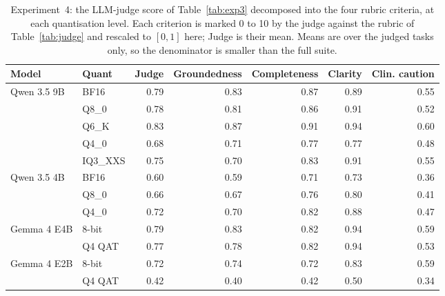 \begin{table}[H]
\centering
\caption{Experiment~4: the LLM-judge score of Table~\ref{tab:exp3} decomposed into the four rubric criteria, at each quantisation level. Each criterion is marked 0 to 10 by the judge against the rubric of Table~\ref{tab:judge} and rescaled to $[0,1]$ here; Judge is their mean. Means are over the judged tasks only, so the denominator is smaller than the full suite.}
\label{tab:exp3_judge}
\small
\setlength{\tabcolsep}{5pt}
\begin{tabular}{@{}ll rrrrr@{}}
\toprule
Model & Quant & Judge & Groundedness & Completeness & Clarity & Clin. caution \\
\midrule
Qwen 3.5 9B & BF16 & 0.79 & 0.83 & 0.87 & 0.89 & 0.55 \\
 & Q8\_0 & 0.78 & 0.81 & 0.86 & 0.91 & 0.52 \\
 & Q6\_K & 0.83 & 0.87 & 0.91 & 0.94 & 0.60 \\
 & Q4\_0 & 0.68 & 0.71 & 0.77 & 0.77 & 0.48 \\
 & IQ3\_XXS & 0.75 & 0.70 & 0.83 & 0.91 & 0.55 \\
\midrule
Qwen 3.5 4B & BF16 & 0.60 & 0.59 & 0.71 & 0.73 & 0.36 \\
 & Q8\_0 & 0.66 & 0.67 & 0.76 & 0.80 & 0.41 \\
 & Q4\_0 & 0.72 & 0.70 & 0.82 & 0.88 & 0.47 \\
\midrule
Gemma 4 E4B & 8-bit & 0.79 & 0.83 & 0.82 & 0.94 & 0.59 \\
 & Q4 QAT & 0.77 & 0.78 & 0.82 & 0.94 & 0.53 \\
\midrule
Gemma 4 E2B & 8-bit & 0.72 & 0.74 & 0.72 & 0.83 & 0.59 \\
 & Q4 QAT & 0.42 & 0.40 & 0.42 & 0.50 & 0.34 \\
\bottomrule
\end{tabular}
\end{table}
